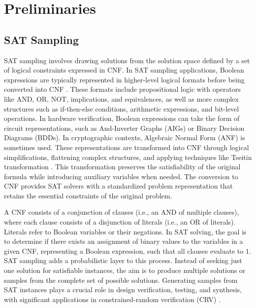 \vspace{-0.2cm}
\section{Preliminaries}
\subsection{SAT Sampling} \label{sec:sat-sampling}

SAT sampling involves drawing solutions from the solution space defined by a set of logical constraints expressed in CNF. In SAT sampling applications, Boolean expressions are typically represented in higher-level logical formats before being converted into CNF \cite{Biere2009SAT, Barrett2013SAT}. These formats include propositional logic with operators like AND, OR, NOT, implications, and equivalences, as well as more complex structures such as if-then-else conditions, arithmetic expressions, and bit-level operations. In hardware verification, Boolean expressions can take the form of circuit representations, such as And-Inverter Graphs (AIGs) or Binary Decision Diagrams (BDDs). In cryptographic contexts, Algebraic Normal Form (ANF) is sometimes used. These representations are transformed into CNF through logical simplifications, flattening complex structures, and applying techniques like Tseitin transformation \cite{tseitin1983complexity}. This transformation preserves the satisfiability of the original formula while introducing auxiliary variables when needed. The conversion to CNF provides SAT solvers with a standardized problem representation that retains the essential constraints of the original problem.






A CNF consists of a conjunction of clauses (i.e., an AND of multiple clauses), where each clause consists of a disjunction of literals (i.e., an OR of literals). Literals refer to Boolean variables or their negations. In SAT solving, the goal is to determine if there exists an assignment of binary values to the variables in a given CNF, representing a Boolean expression, such that all clauses evaluate to $1$. SAT sampling adds a probabilistic layer to this process. Instead of seeking just one solution for satisfiable instances, the aim is to produce multiple solutions or samples from the complete set of possible solutions. Generating samples from SAT instances plays a crucial role in design verification, testing, and synthesis, with significant applications in constrained-random verification (CRV) \cite{Kitchen2007crv}.

